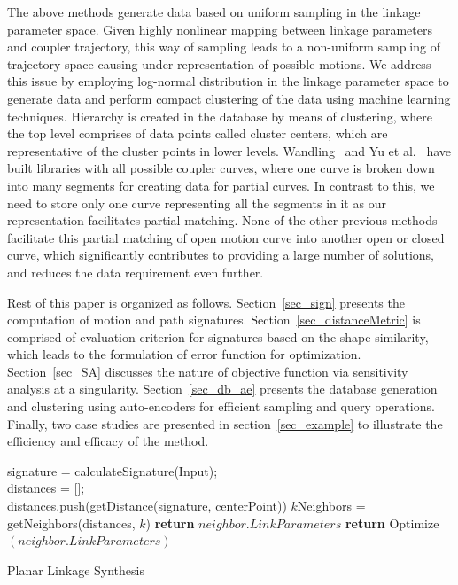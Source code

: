 \documentclass[twocolumn,10pt]{asme2e}
\begin{document}
The above methods generate data based on uniform sampling in the linkage parameter space.
Given highly nonlinear mapping between linkage parameters and coupler trajectory, this way of sampling leads to a non-uniform sampling of trajectory space causing under-representation of possible motions.
We address this issue by employing log-normal distribution in the linkage parameter space to generate data and perform compact clustering of the data using machine learning techniques.
Hierarchy is created in the database by means of clustering, where the top level comprises of data points called cluster centers, which are representative of the cluster points in lower levels.
Wandling~\cite{wandling2000} and Yu et al.~\cite{yue-pathgen2011} have built libraries with all possible coupler curves, where one curve is broken down into many segments for creating data for partial curves.
In contrast to this, we need to store only one curve representing all the segments in it as our representation facilitates partial matching.
None of the other previous methods facilitate this partial matching of open motion curve into another open or closed curve, which significantly contributes to providing a large number of solutions, and reduces the data requirement even further.

Rest of this paper is organized as follows. Section~\ref{sec_sign} presents the computation of motion and path signatures.
Section~\ref{sec_distanceMetric} is comprised of evaluation criterion for signatures based on the shape similarity, which leads to the formulation of error function for optimization.
Section~\ref{sec_SA} discusses the nature of objective function via sensitivity analysis at a singularity.
Section~\ref{sec_db_ae} presents the database generation and clustering using auto-encoders for efficient sampling and query operations.
Finally, two case studies are presented in section~\ref{sec_example} to illustrate the efficiency and efficacy of the method.

\begin{algorithm}
    signature = calculateSignature(Input); \\
    distances = [];\\
    {
      distances.push(getDistance(signature, centerPoint))
    }
    $k$Neighbors = getNeighbors(distances, $k$)
    {
      {
        \textbf{return} $neighbor.LinkParameters$
      }
      {
        \textbf{return} Optimize$(neighbor.LinkParameters)$
      }
    }
    \caption{Planar Linkage Synthesis}
    \label{alg_overall}
\end{algorithm}
\end{document}

